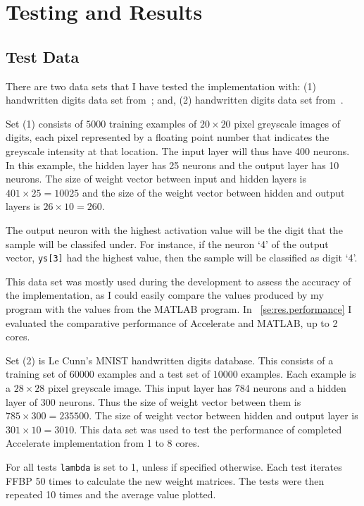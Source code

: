 \chapter{Testing and Results}\label{ch:results}

\section{Test Data}\label{se:res.testdata}
There are two data sets that I have tested the implementation with: (1) handwritten digits data set from~\cite{Ng12}; and, (2) handwritten digits data set from~\cite{LeCCorBur}.

Set (1) consists of $5000$ training examples of $20 \times 20$ pixel greyscale images of digits, each pixel represented by a floating point number that indicates the greyscale intensity at that location. The input layer will thus have 400 neurons. In this example, the hidden layer has 25 neurons and the output layer has 10 neurons. The size of weight vector between input and hidden layers is $401 \times 25 = 10025$ and the size of the weight vector between hidden and output layers is $26 \times 10 = 260$. 

The output neuron with the highest activation value will be the digit that the sample will be classifed under. For instance, if the neuron `4' of the output vector, \texttt{ys[3]} had the highest value, then the sample will be classified as digit `4'.

This data set was mostly used during the development to assess the accuracy of the implementation, as I could easily compare the values produced by my program with the values from the MATLAB program. In ~\ref{se:res.performance} I evaluated the comparative performance of Accelerate and MATLAB, up to 2 cores.

Set (2) is Le Cunn's MNIST handwritten digits database. This consists of a training set of $60000$ examples and a test set of $10000$ examples. Each example is a $28 \times 28$ pixel greyscale image. This input layer has 784 neurons and a hidden layer of 300 neurons. Thus the size of weight vector between them is $785 \times 300 = 235500$. The size of weight vector between hidden and output layer is $301 \times 10 = 3010$. This data set was used to test the performance of completed Accelerate implementation from 1 to 8 cores.

For all tests \texttt{lambda} is set to 1, unless if specified otherwise. Each test iterates FFBP 50 times to calculate the new weight matrices. The tests were then repeated 10 times and the average value plotted. 

